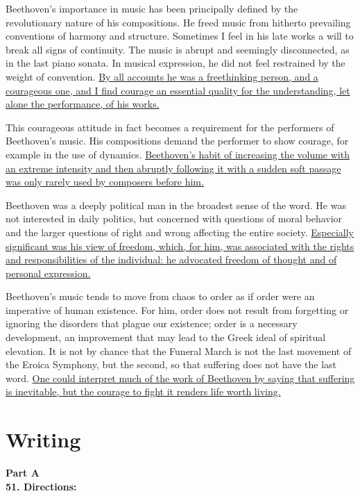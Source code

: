 Beethoven's importance in music has been principally defined by the
revolutionary nature of his compositions. He freed music from hitherto
prevailing conventions of harmony and structure. Sometimes I feel in his
late works a will to break all signs of continuity. The music is abrupt
and seemingly disconnected, as in the last piano sonata. In musical
expression, he did not feel restrained by the weight of convention. 
\transnum \uline{By all accounts he was a freethinking person, and a
	courageous one, and I find courage an essential quality for the
	understanding, let alone the performance, of his works.}

This courageous attitude in fact becomes a requirement for the
performers of Beethoven's music. His compositions demand the performer
to show courage, for example in the use of dynamics.
\transnum \uline{Beethoven's habit of increasing the volume with an extreme
	intensity and then abruptly following it with a sudden soft passage was
	only rarely used by composers before him.}

Beethoven was a deeply political man in the broadest sense of the word.
He was not interested in daily politics, but concerned with questions of
moral behavior and the larger questions of right and wrong affecting the
entire society. \transnum  \uline{Especially significant was his view of
	freedom, which, for him, was associated with the rights and
	responsibilities of the individual: he advocated freedom of thought and
	of personal expression.}

Beethoven's music tends to move from chaos to order as if order were an
imperative of human existence. For him, order does not result from
forgetting or ignoring the disorders that plague our existence; order is
a necessary development, an improvement that may lead to the Greek ideal
of spiritual elevation. It is not by chance that the Funeral March is
not the last movement of the Eroica Symphony, but the second, so that
suffering does not have the last word. \transnum \uline{One could
	interpret much of the work of Beethoven by saying that suffering is
	inevitable, but the courage to fight it renders life worth living.}




\newpage
\section{Writing}


\noindent
\textbf{Part A}\\
\textbf{51. Directions:}

